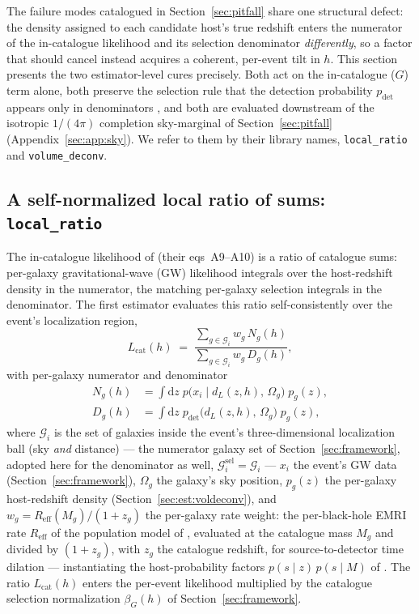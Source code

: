 The failure modes catalogued in Section~\ref{sec:pitfall} share one structural defect: the density assigned to each candidate host's true redshift enters the numerator of the in-catalogue likelihood and its selection denominator \emph{differently}, so a factor that should cancel instead acquires a coherent, per-event tilt in $h$. This section presents the two estimator-level cures precisely. Both act on the in-catalogue ($G$) term alone, both preserve the selection rule that the detection probability $p_\mathrm{det}$ appears only in denominators \citep{Mandel:2018mve}, and both are evaluated downstream of the isotropic $1/(4\pi)$ completion sky-marginal of Section~\ref{sec:pitfall} (Appendix~\ref{sec:app:sky}). We refer to them by their library names, \texttt{local\_ratio} and \texttt{volume\_deconv}.

\subsection{A self-normalized local ratio of sums: \texttt{local\_ratio}}
\label{sec:est:localratio}

The in-catalogue likelihood of \citet{Gray:2019ksv} (their eqs~A9--A10) is a ratio of catalogue sums: per-galaxy gravitational-wave (GW) likelihood integrals over the host-redshift density in the numerator, the matching per-galaxy selection integrals in the denominator. The first estimator evaluates this ratio self-consistently over the event's localization region,
\begin{equation}
  L_\mathrm{cat}(h) \;=\;
  \frac{\sum_{g \in \mathcal{G}_i} w_g\, N_g(h)}
       {\sum_{g \in \mathcal{G}_i} w_g\, D_g(h)},
  \label{eq:est:lcat}
\end{equation}
with per-galaxy numerator and denominator
\begin{align}
  N_g(h) &= \int \mathrm{d}z\;
    p\big(x_i \mid d_L(z,h),\, \Omega_g\big)\; p_g(z),
  \label{eq:est:Ng}\\
  D_g(h) &= \int \mathrm{d}z\;
    p_\mathrm{det}\big(d_L(z,h),\, \Omega_g\big)\; p_g(z),
  \label{eq:est:Dg}
\end{align}
where $\mathcal{G}_i$ is the set of galaxies inside the event's three-dimensional localization ball (sky \emph{and} distance) --- the numerator galaxy set of Section~\ref{sec:framework}, adopted here for the denominator as well, $\mathcal{G}_i^{\mathrm{sel}} = \mathcal{G}_i$ --- $x_i$ the event's GW data (Section~\ref{sec:framework}), $\Omega_g$ the galaxy's sky position, $p_g(z)$ the per-galaxy host-redshift density (Section~\ref{sec:est:voldeconv}), and $w_g = R_\mathrm{eff}(M_g)/(1+z_g)$ the per-galaxy rate weight: the per-black-hole EMRI rate $R_\mathrm{eff}$ of the population model of \citet{Babak:2017tow}, evaluated at the catalogue mass $M_g$ and divided by $(1+z_g)$, with $z_g$ the catalogue redshift, for source-to-detector time dilation --- instantiating the host-probability factors $p(s\mid z)\,p(s\mid M)$ of \citet{Gray:2019ksv}. The ratio $L_\mathrm{cat}(h)$ enters the per-event likelihood multiplied by the catalogue selection normalization $\beta_G(h)$ of Section~\ref{sec:framework}.

